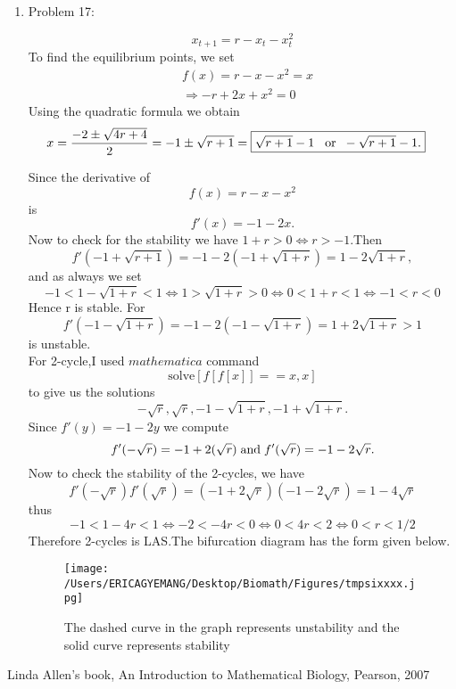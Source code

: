 \documentclass[12pt]{article}
\begin{document}
\begin{enumerate}
\cleardoublepage


\item Problem 17:

 \[x_{t+1}=r-x_t-x^2_t\] 
To find the equilibrium points, we set 
\begin{align*}
&f(x)=r-x-x^2=x\\
&\Rightarrow -r+2x+x^2=0
\end{align*}
Using the quadratic formula we obtain
\begin{align*}
x&=\frac{-2\pm \sqrt{4r+4}}{2}= -1\pm \sqrt{r+1}=\boxed{ \sqrt{r+1}-1 \hspace{0.3cm}\mbox{or}\hspace{0.2cm} -\sqrt{r+1}-1.}
\end{align*}

Since the derivative of 
\[f(x)=r-x-x^2\]
is
\[\boxed{f'(x)=-1-2x}.\]
Now to check for the stability we have $1+r>0\Leftrightarrow r>-1$.Then
\[f'(-1+\sqrt{r+1})=-1-2(-1+\sqrt{1+r})=1-2\sqrt{1+r},\]
 and as always we set 
 \[-1<1-\sqrt{1+r}<1\Leftrightarrow 1>\sqrt{1+r}>0 \Leftrightarrow 0<1+r<1 \Leftrightarrow \boxed{-1<r<0}\]
 Hence r is stable.
 For
  \[f'(-1-\sqrt{1+r})=-1-2(-1-\sqrt{1+r})=1+2\sqrt{1+r}>1\]  is unstable.\\
 
 
 For 2-cycle,I used $mathematica$ command \[\mbox{solve}[f[f[x]]==x,x]\] to give us the solutions 
 \[-\sqrt{r},\sqrt{r},-1-\sqrt{1+r},-1+\sqrt{1+r}.\]
 Since $f'(y)=-1-2y$
 we compute
 \[f'(-\sqrt{r})= -1+2(\sqrt{r})\hspace{0.1cm} \mbox{and}\hspace{0.1cm} f'(\sqrt{r})= -1-2\sqrt{r} .\]
 Now to check the stability of the 2-cycles, we have
 \[f'(-\sqrt{r})f'(\sqrt{r})=(-1+2\sqrt{r})(-1-2\sqrt{r})=1-4\sqrt{r}\]
 thus
 \[-1<1-4r<1 \Leftrightarrow -2<-4r<0 \Leftrightarrow 0<4r<2 \Leftrightarrow \boxed{0<r<1/2}\]
 Therefore 2-cycles is LAS.The bifurcation diagram has the form given below.

\cleardoublepage

\begin{figure} [ht!]
 \centering
 \texttt{[image: /Users/ERICAGYEMANG/Desktop/Biomath/Figures/tmpsixxxx.jpg]} 
        \caption[Figure 2.4: r>1]{The dashed curve in the graph represents unstability and the solid curve represents stability}
 \label{fig::model}
\end{figure}




\end{enumerate}





\cleardoublepage

\begin{thebibliography}{99}
 Linda Allen’s book, An Introduction to Mathematical Biology, Pearson, 2007


\end{thebibliography}
\end{document}
